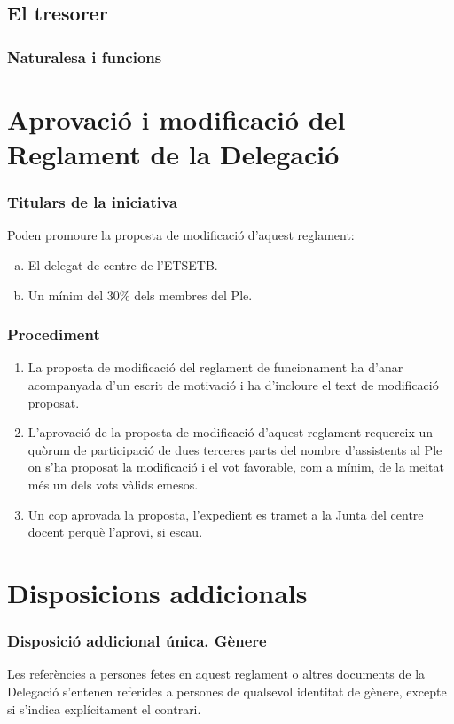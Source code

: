 \documentclass[a4paper,12pt]{article}
\renewcommand*{\thesubsubsection}{\arabic{subsubsection}}
\begin{document}
\subsection{El tresorer}
\subsubsection{Naturalesa i funcions}

\section{Aprovació i modificació del Reglament de la Delegació}
\subsubsection{Titulars de la iniciativa}
Poden promoure la proposta de modificació d'aquest reglament:
\begin{enumerate}[a)]
	\item El delegat de centre de l'ETSETB.
	\item Un mínim del 30\% dels membres del Ple.
\end{enumerate}

\subsubsection{Procediment}
\begin{enumerate}[\thesubsubsection.1]
	\item La proposta de modificació del reglament de funcionament ha d'anar acompanyada d'un escrit de motivació i ha d'incloure el text de modificació proposat.
	\item L'aprovació de la proposta de modificació d'aquest reglament requereix un quòrum de participació de dues terceres parts del nombre d'assistents al Ple on s'ha proposat la modificació i el vot favorable, com a mínim, de la meitat més un dels vots vàlids emesos.
	\item Un cop aprovada la proposta, l'expedient es tramet a la Junta del centre docent perquè l'aprovi, si escau.
\end{enumerate}

\section*{Disposicions addicionals}

\subsubsection*{Disposició addicional única. Gènere}
Les referències a persones fetes en aquest reglament o altres documents de la Delegació s'entenen referides a persones de qualsevol identitat de gènere, excepte si s'indica explícitament el contrari.
\end{document}
